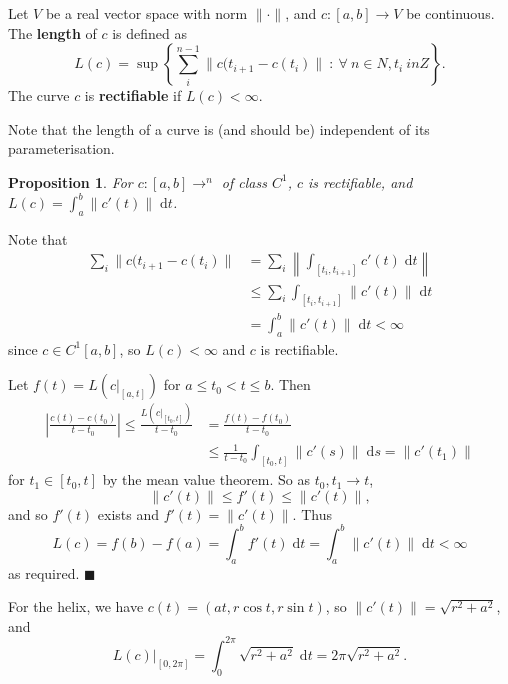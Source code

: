 \documentclass[letter-paper]{tufte-book}
\newtheorem{proposition}[theorem]{\color{pastel-blue}Proposition}
\newenvironment{proof}[1][Proof]{\begin{trivlist}
\item[\hskip \labelsep {\bfseries #1}]}{\end{trivlist}}
\newenvironment{example}[1][Example]{\begin{trivlist}
\item[\hskip \labelsep {\bfseries #1}]}{\end{trivlist}}
\newcommand{\qed}{\hfill$\blacksquare$}
\begin{document}
Let $V$ be a real vector space with norm $\|\cdot\|$, and $c:[a,b] \to V$ be
continuous. The \textbf{length} of $c$ is defined as
\begin{equation*}
  L(c) = \sup \left\{\sum_i^{n-1} \|c(t_{i+1} - c(t_i)\|\ :\ \forall\ n\in N, t_i \ in Z\right\}.
\end{equation*}
The curve $c$ is \textbf{rectifiable} if $L(c) < \infty$.

Note that the length of a curve is (and should be) independent of its
parameterisation.

\begin{proposition}
  For $c: [a,b] \to^n$ of class $C^1$, $c$ is rectifiable, and $L(c) = \int_a^b
  \|c'(t)\|\; \mathrm{d}t$.
\end{proposition}

\begin{proof}
  Note that
  \begin{align*}
    \sum_i \| c(t_{i+1} - c(t_i)\| & = \sum_i \left\| \int_{[t_i, t_{i+1}]} c'(t)\; \mathrm{d}t\right\| \\
      & \leq \sum_i \int_{[t_i, t_{i+1}]} \|c'(t)\|\; \mathrm{d}t\\
      &= \int_a^b \|c'(t)\|\; \mathrm{d}t < \infty
  \end{align*}
  since $c \in C^1[a,b]$, so $L(c) < \infty$ and $c$ is rectifiable.
  
  Let $f(t) = L\left(c|_{[a,t]}\right)$ for $a \leq t_0 < t \leq b$. Then
  \begin{align*}
    \left|\frac{c(t) - c(t_0)}{t - t_0} \right| \leq \frac{L\left(c|_{[t_0,t]}\right)}{t - t_0}  &= \frac{f(t) - f(t_0)}{t - t_0} \\
      &\leq \frac{1}{t - t_0} \int_{[t_0, t]} \|c'(s)\|\; \mathrm{d}s = \|c'(t_1)\|
  \end{align*}
  for $t_1 \in [t_0, t]$ by the mean value theorem. So as $t_0, t_1 \to t$,
  \begin{equation*}
    \|c'(t)\| \leq f'(t) \leq \|c'(t)\|,
  \end{equation*}
  and so $f'(t)$ exists and $f'(t) = \|c'(t)\|$. Thus
  \begin{equation*}
    L(c) = f(b) - f(a) = \int_a^b f'(t)\; \mathrm{d}t = \int_a^b \|c'(t)\|\; \mathrm{d}t < \infty
  \end{equation*}
  as required. \qed
\end{proof}

\begin{example}
  For the helix, we have $c(t) = (at, r\cos t, r\sin t)$, so $\|c'(t)\| =
  \sqrt{r^2 + a^2}$, and
  \begin{equation*}
    L(c)|_{[0, 2\pi]} = \int_0^{2\pi} \sqrt{r^2 + a^2}\; \mathrm{d}t = 2\pi \sqrt{r^2 + a^2}.
  \end{equation*}
\end{example}
\end{document}
